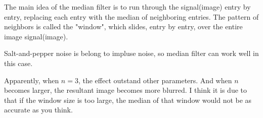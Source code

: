 \documentclass{article}
\begin{document}
\begin{enumerate}[label=(\alph*)]
    The main idea of the median filter is to run through the signal(image) entry by entry, replacing each entry with the median of neighboring entries. The pattern of neighbors is called the "window", which slides, entry by entry, over the entire image signal(image).

    Salt-and-pepper noise is belong to impluse noise, so median filter can work well in this case.

    \newpage
    Apparently, when $n = 3$, the effect outstand other parameters. And when $n$ becomes larger, the resultant image becomes more blurred. I think it is due to that if the window size is too large, the median of that window would not be as accurate as you think.

    \begin{figure}[!htb]
        \centering
        

\end{figure}
\end{enumerate}
\end{document}
